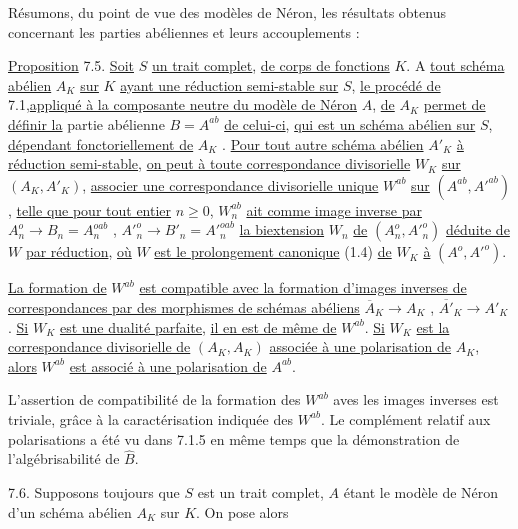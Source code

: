 Résumons, du point de vue des modèles de Néron, les résultats obtenus concernant les parties abéliennes et leurs accouplements :

\underline{Proposition} 7.5. \underline{Soit} $S$ \underline{un trait complet}, \underline{de corps de fonctions} $K$. A \underline{tout schéma abélien} $A_K$ \underline{sur} $K$ \underline{ayant une réduction semi-stable sur} $S$, \underline{le procédé de} 7.1,\underline{appliqué à la composante neutre du modèle de Néron} $A$, \underline{de} $A_K$ \underline{permet de définir la} partie abélienne $B = A^{ab}$ \underline{de celui-ci}, \underline{qui est un schéma abélien sur} $S$, \underline{dépendant fonctoriellement de} $A_K$ . \underline{Pour tout autre schéma abélien} $A'_K$ \underline{à réduction semi-stable}, \underline{on peut à toute correspondance divisorielle} $W_K$ \underline{sur} $(A_K,A'_K)$, \underline{associer une correspondance divisorielle unique} $W^{ab}$ \underline{sur} $(A^{ab},{A'}^{ab})$, \underline{telle que pour tout entier} $n \geq 0$, $W_n^{ab}$ \underline{ait comme image inverse par} $A_n^o \longrightarrow B_n = A_n^{oab}$ , ${A'}^{o}_{n} \longrightarrow B'_n = {A'}^{oab}_{n}$ \underline{la biextension} $W_n$ \underline{de} $(A_n^o,{A'}^{o}_{n})$ \underline{déduite de} $W$ \underline{par réduction}, \underline{où} $W$ \underline{est le prolongement canonique} (1.4) \underline{de} $W_K$ \underline{à} $(A^o,{A'}^{o})$.



\underline{La formation de} $W^{ab}$ \underline{est compatible avec la formation d'images inverses de correspondances par des morphismes de schémas abéliens} $\overline{A}_K \longrightarrow A_K$ , $\overline{A'}_K \longrightarrow A'_K$ . \underline{Si} $W_K$ \underline{est une dualité parfaite}, \underline{il en est de même de} $W^{ab}$. \underline{Si} $W_K$ \underline{est la correspondance divisorielle de} $(A_K,A_K)$ \underline{associée à une polarisation de} $A_K$, \underline{alors} $W^{ab}$ \underline{est associé à une polarisation de} $A^{ab}$.

L'assertion de compatibilité de la formation des $W^{ab}$ aves les images inverses est triviale, grâce à la caractérisation indiquée des $W^{ab}$. Le complément relatif aux polarisations a été vu dans 7.1.5 en même temps que la démonstration de l'algébrisabilité de $\hat{B}$.

7.6. Supposons toujours que $S$ est un trait complet, $A$ étant le modèle de Néron d'un schéma abélien $A_K$ sur $K$. On pose alors

